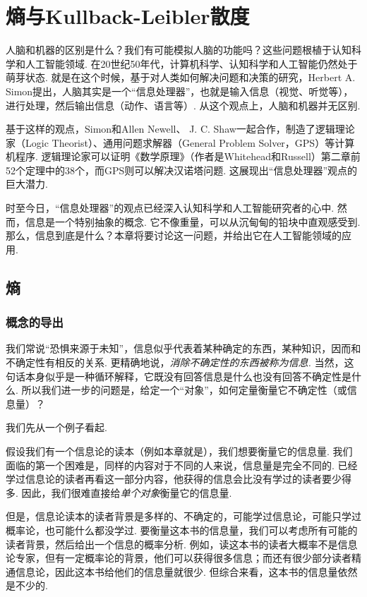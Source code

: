 \chapter{熵与Kullback-Leibler散度}\label{chap:information-theory}

人脑和机器的区别是什么？我们有可能模拟人脑的功能吗？这些问题根植于认知科学和人工智能领域. 在20世纪50年代，计算机科学、认知科学和人工智能仍然处于萌芽状态. 就是在这个时候，基于对人类如何解决问题和决策的研究，Herbert A. Simon提出，人脑其实是一个“信息处理器”，也就是输入信息（视觉、听觉等），进行处理，然后输出信息（动作、语言等）. 从这个观点上，人脑和机器并无区别. 

基于这样的观点，Simon和Allen Newell、 J. C. Shaw一起合作，制造了逻辑理论家（Logic Theorist）、通用问题求解器（General Problem Solver，GPS）等计算机程序. 逻辑理论家可以证明《数学原理》（作者是Whitehead和Russell）第二章前52个定理中的38个，而GPS则可以解决汉诺塔问题. 这展现出“信息处理器”观点的巨大潜力. 

时至今日，“信息处理器”的观点已经深入认知科学和人工智能研究者的心中. 然而，信息是一个特别抽象的概念. 它不像重量，可以从沉甸甸的铅块中直观感受到. 那么，信息到底是什么？本章将要讨论这一问题，并给出它在人工智能领域的应用. 

\section{熵}\label{sec:entropy}


\subsection{概念的导出}

我们常说“恐惧来源于未知”，信息似乎代表着某种确定的东西，某种知识，因而和不确定性有相反的关系. 更精确地说，\textit{消除不确定性的东西被称为信息.} 当然，这句话本身似乎是一种循环解释，它既没有回答信息是什么也没有回答不确定性是什么. 所以我们进一步的问题是，给定一个“对象”，如何定量衡量它不确定性（或信息量）？

我们先从一个例子看起. 
\begin{example}[信息论读本]
    假设我们有一个信息论的读本（例如本章就是），我们想要衡量它的信息量. 我们面临的第一个困难是，同样的内容对于不同的人来说，信息量是完全不同的. 已经学过信息论的读者再看这一部分内容，他获得的信息会比没有学过的读者要少得多. 因此，我们很难直接给\textit{单个对象}衡量它的信息量. 

    但是，信息论读本的读者背景是多样的、不确定的，可能学过信息论，可能只学过概率论，也可能什么都没学过. 要衡量这本书的信息量，我们可以考虑所有可能的读者背景，然后给出一个信息的概率分析. 例如，读这本书的读者大概率不是信息论专家，但有一定概率论的背景，他们可以获得很多信息；而还有很少部分读者精通信息论，因此这本书给他们的信息量就很少. 但综合来看，这本书的信息量依然是不少的. 
\end{example}

